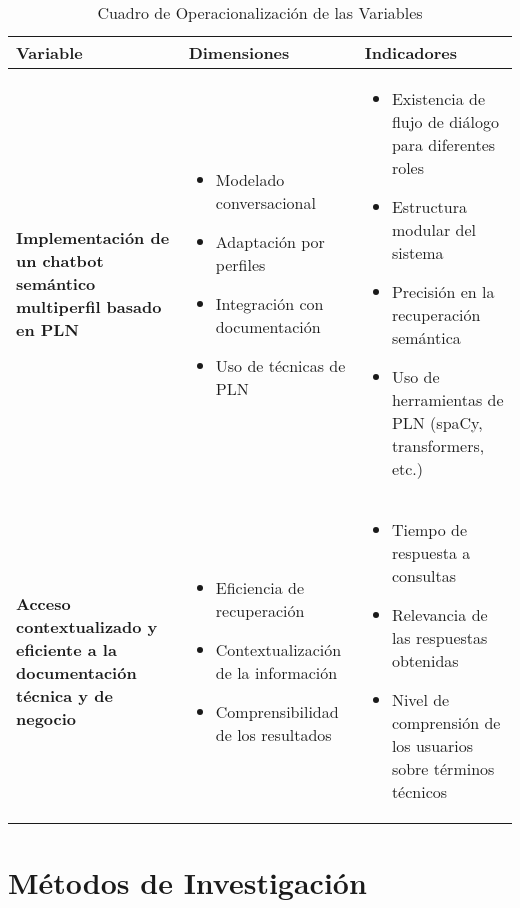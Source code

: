\begin{table}[H]
\centering
\renewcommand{\arraystretch}{1.5}
\begin{tabular}{|p{4cm}|p{5cm}|p{6cm}|}
\hline
\textbf{Variable} & \textbf{Dimensiones} & \textbf{Indicadores} \\
\hline
\textbf{Implementación de un chatbot semántico multiperfil basado en PLN} & 
\begin{itemize}
  \item Modelado conversacional
  \item Adaptación por perfiles
  \item Integración con documentación
  \item Uso de técnicas de PLN
\end{itemize} &
\begin{itemize}
  \item Existencia de flujo de diálogo para diferentes roles
  \item Estructura modular del sistema
  \item Precisión en la recuperación semántica
  \item Uso de herramientas de PLN (spaCy, transformers, etc.)
\end{itemize} \\
\hline

\textbf{Acceso contextualizado y eficiente a la documentación técnica y de negocio} & 
\begin{itemize}
  \item Eficiencia de recuperación
  \item Contextualización de la información
  \item Comprensibilidad de los resultados
\end{itemize} &
\begin{itemize}
  \item Tiempo de respuesta a consultas
  \item Relevancia de las respuestas obtenidas
  \item Nivel de comprensión de los usuarios sobre términos técnicos
\end{itemize} \\
\hline
\end{tabular}
\caption{Cuadro de Operacionalización de las Variables}
\label{tab:operacionalizacion}
\end{table}

\section{Métodos de Investigación}

